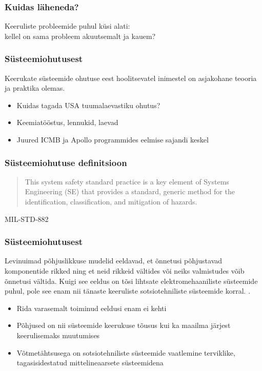 \fi

\begin{frame}[fragile]
	\frametitle{Kuidas läheneda?}
	\vfill
	\begin{center}
		Keeruliste probleemide puhul küsi alati: \\kellel on sama probleem akuutsemalt ja kauem?  
	\end{center}
	\vfill
\end{frame}

\begin{frame}[fragile]
  \frametitle{Süsteemiohutusest}
	Keerukate süsteemide ohutuse eest hoolitsevatel inimestel on asjakohane teooria ja praktika olemas.
	\begin{itemize}
		\item Kuidas tagada USA tuumalaevastiku ohutus?
		\item Keemiatööstus, lennukid, laevad 
		\item Juured ICMB ja Apollo programmides eelmise sajandi keskel
	\end{itemize}
\end{frame}

\begin{frame}[fragile]
  \frametitle{Süsteemiohutuse definitsioon}
	\begin{center}
		\begin{quote}
			This system safety standard practice is a key element of Systems Engineering (SE) that provides a standard, generic method for the identification, classification, and mitigation of hazards.
		\end{quote}
	\end{center}
			MIL-STD-882
	
\end{frame}

\begin{frame}[fragile]
  \frametitle{Süsteemiohutusest}
	Levinuimad põhjuslikkuse mudelid eeldavad, et õnnetusi põhjustavad komponentide rikked ning et neid rikkeid vältides või neiks valmistudes võib õnnetusi vältida. Kuigi see eeldus on tõsi lihtsate elektromehaaniliste süsteemide puhul, pole see enam nii tänaste keeruliste sotsiotehniliste süsteemide korral. \cite{leveson2011engineering}.
	\begin{itemize}
		\item Rida varasemalt toiminud eeldusi enam ei kehti
		\item Põhjused on nii süsteemide keerukuse tõusus kui ka maailma järjest keerulisemaks muutumises
		\item Võtmetähtsusega on sotsiotehniliste süsteemide vaatlemine terviklike, tagasisidestatud mittelineaarsete süsteemidena
	\end{itemize}
\end{frame}


